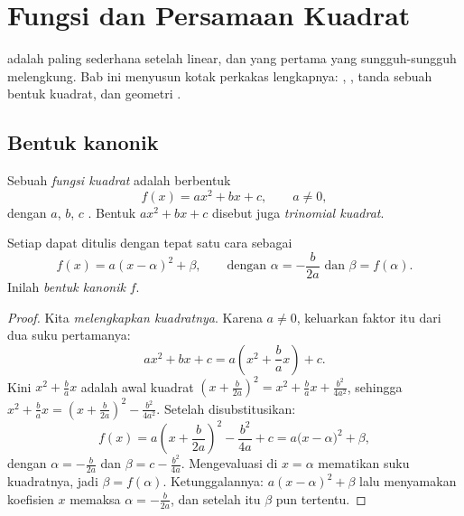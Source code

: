 \chapter{Fungsi dan Persamaan Kuadrat}\label{ch:g11:quad}

 adalah  paling sederhana setelah  linear, dan
yang pertama yang  sungguh-sungguh melengkung. Bab ini menyusun
kotak perkakas lengkapnya: , , tanda sebuah
bentuk kuadrat, dan geometri .

\section{Bentuk kanonik}

\begin{definition}\label{def:g11:quad:quadratic}
Sebuah \emph{fungsi kuadrat} adalah  berbentuk
\[
f(x) = ax^2 + bx + c, \qquad a \neq 0,
\]
dengan $a$, $b$, $c$ . Bentuk $ax^2 + bx + c$ disebut
juga \emph{trinomial kuadrat}.
\end{definition}

\begin{theorem}\label{thm:g11:quad:canonical}
Setiap  dapat ditulis dengan tepat satu cara sebagai
\[
f(x) = a(x - \alpha)^2 + \beta,
\qquad\text{dengan } \alpha = -\frac{b}{2a} \text{ dan } \beta = f(\alpha).
\]
Inilah \emph{bentuk kanonik} $f$.
\end{theorem}

\begin{proof}
Kita \emph{melengkapkan kuadratnya}. Karena $a \neq 0$, keluarkan faktor itu
dari dua suku pertamanya:
\[
ax^2 + bx + c = a\left(x^2 + \frac{b}{a}x\right) + c .
\]
Kini $x^2 + \frac{b}{a}x$ adalah awal kuadrat
$\left(x + \frac{b}{2a}\right)^2 = x^2 + \frac ba x + \frac{b^2}{4a^2}$,
sehingga $x^2 + \frac{b}{a}x = \left(x + \frac{b}{2a}\right)^2 -
\frac{b^2}{4a^2}$. Setelah disubstitusikan:
\[
f(x) = a\left(x + \frac{b}{2a}\right)^2 - \frac{b^2}{4a} + c
= a\bigl(x - \alpha\bigr)^2 + \beta,
\]
dengan $\alpha = -\frac{b}{2a}$ dan $\beta = c - \frac{b^2}{4a}$. Mengevaluasi
di $x = \alpha$ mematikan suku kuadratnya, jadi $\beta = f(\alpha)$. Ketunggalannya:
 $a(x-\alpha)^2 + \beta$ lalu menyamakan koefisien $x$
memaksa $\alpha = -\frac{b}{2a}$, dan setelah itu $\beta$ pun tertentu.
\end{proof}

